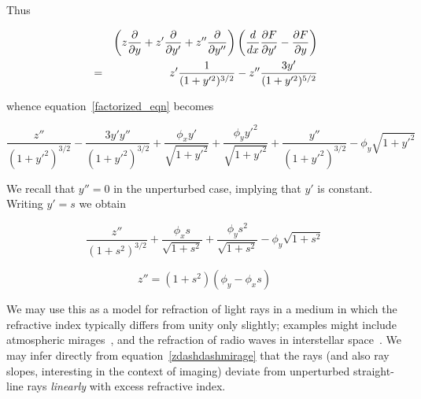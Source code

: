 \documentclass[pdflatex,sn-mathphys-num]{sn-jnl}%
\theoremstyle{thmstyleone}%
\theoremstyle{thmstyletwo}%
\theoremstyle{thmstylethree}%
\begin{document}
Thus

\begin{eqnarray}
&{}& \left(z\frac{\partial{}}{\partial{y}} + z'\frac{\partial{}}{\partial{y'}} + z''\frac{\partial{}}{\partial{y''}}\right)\left(\frac{d}{dx}\frac{\partial{F}}{\partial{y'}} - \frac{\partial{F}}{\partial{y}}\right)\nonumber\\
&=&  z'\frac{1}{(1+y'^2)^{3/2}} -z''\frac{3y'}{(1+y'^2)^{5/2}}
\end{eqnarray}

whence equation~\ref{factorized_eqn} becomes

\begin{equation}
    \frac{z''}{(1+y'^2)^{3/2}}
  - \frac{3y'y''}{(1+y'^2)^{3/2}}
  + \frac{\phi_xy'}{\sqrt{1+y'^2}}
  + \frac{\phi_yy'^2}{\sqrt{1+y'^2}}
  + \frac{y''}{(1+y'^2)^{3/2}}-\phi_y\sqrt{1+y'^2}
\end{equation}

We recall that $y'' = 0$ in the unperturbed case, implying that $y'$
is constant.  Writing $y'= s$ we obtain

\begin{equation}\nonumber
  \frac{z''}{(1+s^2)^{3/2}} +
  \frac{\phi_xs}{\sqrt{1+s^2}} + \frac{\phi_ys^2}{\sqrt{1+s^2}} -\phi_y\sqrt{1+s^2}
\end{equation}

\begin{equation}\label{zdashdashmirage}
  z'' = (1+s^2)(\phi_y-\phi_xs)
\end{equation}

We may use this as a model for refraction of light rays in a medium in
which the refractive index typically differs from unity only slightly;
examples might include atmospheric mirages~\cite{trankle1999}, and the
refraction of radio waves in interstellar space~\cite{romani1986}.  We
may infer directly from equation~\ref{zdashdashmirage} that the rays
(and also ray slopes, interesting in the context of imaging) deviate
from unperturbed straight-line rays {\em linearly} with excess
refractive index.


%
\end{document}
